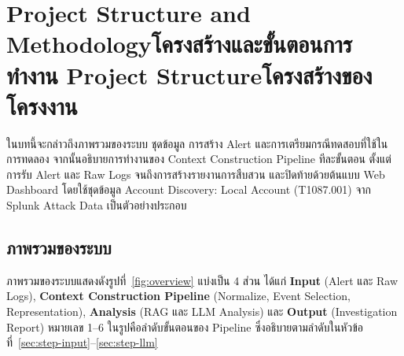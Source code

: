 \providecommand{\topkstep}[1]{\par\medskip\noindent\phantomsection\textbf{#1}\par\nopagebreak\smallskip}

\chapter{\ifproject%
\ifenglish Project Structure and Methodology\else โครงสร้างและขั้นตอนการทำงาน\fi
\else%
\ifenglish Project Structure\else โครงสร้างของโครงงาน\fi
\fi
}

ในบทนี้จะกล่าวถึงภาพรวมของระบบ ชุดข้อมูล การสร้าง Alert และการเตรียมกรณีทดสอบที่ใช้ในการทดลอง
จากนั้นอธิบายการทำงานของ Context Construction Pipeline ทีละขั้นตอน
ตั้งแต่การรับ Alert และ Raw Logs จนถึงการสร้างรายงานการสืบสวน และปิดท้ายด้วยต้นแบบ Web Dashboard
โดยใช้ชุดข้อมูล Account Discovery: Local Account (T1087.001) จาก Splunk Attack Data เป็นตัวอย่างประกอบ

\section{ภาพรวมของระบบ}

ภาพรวมของระบบแสดงดังรูปที่~\ref{fig:overview} แบ่งเป็น 4 ส่วน ได้แก่
\textbf{Input} (Alert และ Raw Logs),
\textbf{Context Construction Pipeline} (Normalize, Event Selection, Representation),
\textbf{Analysis} (RAG และ LLM Analysis) และ \textbf{Output} (Investigation Report)
หมายเลข 1--6 ในรูปคือลำดับขั้นตอนของ Pipeline ซึ่งอธิบายตามลำดับในหัวข้อที่~\ref{sec:step-input}--\ref{sec:step-llm}

